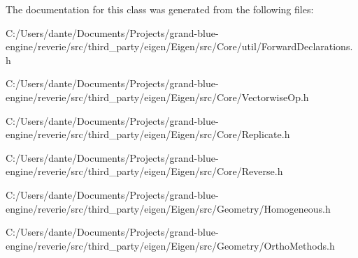 The documentation for this class was generated from the following files\+:\begin{DoxyCompactItemize}
\item 
C\+:/\+Users/dante/\+Documents/\+Projects/grand-\/blue-\/engine/reverie/src/third\+\_\+party/eigen/\+Eigen/src/\+Core/util/Forward\+Declarations.\+h\item 
C\+:/\+Users/dante/\+Documents/\+Projects/grand-\/blue-\/engine/reverie/src/third\+\_\+party/eigen/\+Eigen/src/\+Core/Vectorwise\+Op.\+h\item 
C\+:/\+Users/dante/\+Documents/\+Projects/grand-\/blue-\/engine/reverie/src/third\+\_\+party/eigen/\+Eigen/src/\+Core/Replicate.\+h\item 
C\+:/\+Users/dante/\+Documents/\+Projects/grand-\/blue-\/engine/reverie/src/third\+\_\+party/eigen/\+Eigen/src/\+Core/Reverse.\+h\item 
C\+:/\+Users/dante/\+Documents/\+Projects/grand-\/blue-\/engine/reverie/src/third\+\_\+party/eigen/\+Eigen/src/\+Geometry/Homogeneous.\+h\item 
C\+:/\+Users/dante/\+Documents/\+Projects/grand-\/blue-\/engine/reverie/src/third\+\_\+party/eigen/\+Eigen/src/\+Geometry/Ortho\+Methods.\+h\end{DoxyCompactItemize}
